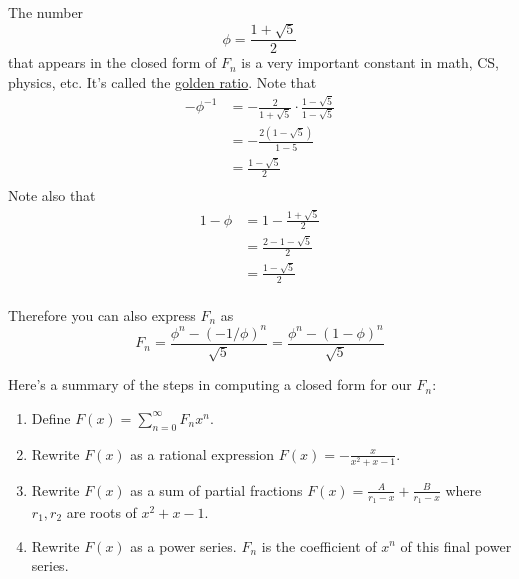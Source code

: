 The number 
\[
\phi = \frac{1 + \sqrt{5}}{2}
\]
that appears in the closed form of $F_n$ is a very important constant
in math, CS, physics, etc. It's called the 
\href{https://en.wikipedia.org/wiki/Golden_ratio}{golden ratio}.
Note that 
\begin{align*}
-\phi^{-1} 
&= -\frac{2}{1 + \sqrt{5}} \cdot \frac{1 - \sqrt{5}}{1 - \sqrt{5}} \\
&= -\frac{2(1 - \sqrt{5})}{1 - 5} \\
&= \frac{1 - \sqrt{5}}{2} \\
\end{align*}
Note also that
\begin{align*}
1 - \phi
&= 1 - \frac{1 + \sqrt{5}}{2} \\
&= \frac{2 - 1 - \sqrt{5}}{2} \\
&= \frac{1 - \sqrt{5}}{2} \\
\end{align*}

Therefore you can also express $F_n$ as 
\[
F_n = 
\frac{
\phi^n
-
(-1/\phi)^n}
{\sqrt{5}}
=
\frac
{\phi^n - (1-\phi)^n}
{\sqrt{5}}
\]

Here's a summary of the steps in computing a closed form
for our $F_n$:
\begin{enumerate}[nosep]
\item Define $F(x) = \sum_{n=0}^\infty F_n x^n$.
\item Rewrite $F(x)$ as a rational expression
  $F(x) = -\frac{x}{x^2 + x -1}$. 
\item Rewrite $F(x)$ as a sum of partial fractions
  $F(x) = \frac{A}{r_1 - x} + \frac{B}{r_1 - x}$ where $r_1, r_2$
  are roots of $x^2 + x -1$.
\item Rewrite $F(x)$ as a power series. $F_n$ is the coefficient of
  $x^n$ of this final power series.
\end{enumerate}





